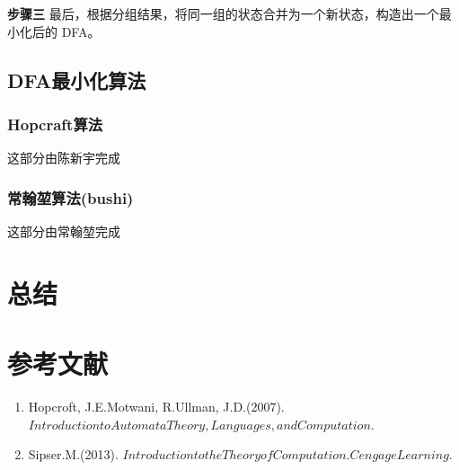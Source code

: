 \documentclass{article}
\begin{document}
    \textbf{步骤三}
    最后，根据分组结果，将同一组的状态合并为一个新状态，构造出一个最小化后的 DFA。
    

\subsection{DFA最小化算法}
\subsubsection{Hopcraft算法}
    这部分由陈新宇完成
\subsubsection{常翰堃算法(bushi)}
    这部分由常翰堃完成


\newpage
\section{总结}




\newpage
\section{参考文献}
\begin{enumerate}
    \item Hopcroft, J.E.Motwani, R.Ullman, J.D.(2007). $Introduction to Automata Theory, Languages, and Computation.$
    \item Sipser.M.(2013). $Introduction to the Theory of Computation. Cengage Learning.$
\end{enumerate}
\end{document}
